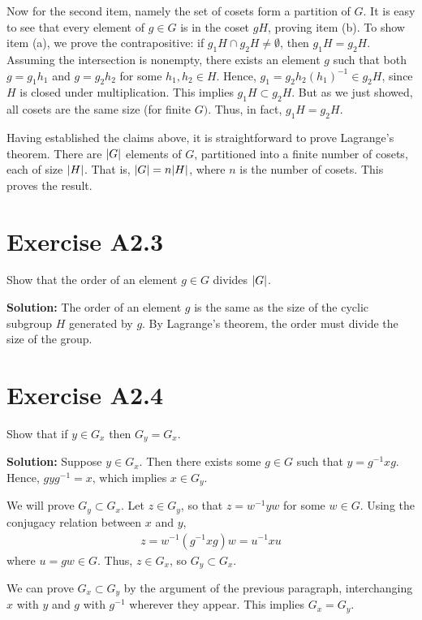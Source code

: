 \documentclass{book}
\begin{document}
    Now for the second item, namely the set of cosets form a partition of $G$. It is easy to see that every element of $g\in G$ is in the coset $gH$, proving item (b). To show item (a), we prove the contrapositive: if $g_1 H\cap g_2 H \neq \emptyset$, then $g_1 H = g_2 H$. Assuming the intersection is nonempty, there exists an element $g$ such that both $g = g_1 h_1$ and $g = g_2 h_2$ for some $h_1, h_2 \in H$. Hence, $g_1 = g_2 h_2 (h_1)^{-1} \in g_2 H$, since $H$ is closed under multiplication. This implies $g_1 H \subset g_2 H$. But as we just showed, all cosets are the same size (for finite $G)$. Thus, in fact, $g_1 H = g_2 H$.
    
    Having established the claims above, it is straightforward to prove Lagrange's theorem. There are $\abs{G}$ elements of $G$, partitioned into a finite number of cosets, each of size $\abs{H}$. That is, $\abs{G} = n\abs{H}$, where $n$ is the number of cosets. This proves the result.
    
\section*{Exercise A2.3}
    Show that the order of an element $g\in G$ divides $\abs{G}$.
    
    \textbf{Solution:} The order of an element $g$ is the same as the size of the cyclic subgroup $H$ generated by $g$. By Lagrange's theorem, the order must divide the size of the group.
    
\section*{Exercise A2.4}
    Show that if $y\in G_x$ then $G_y = G_x$.
    
    \textbf{Solution:} Suppose $y\in G_x$. Then there exists some $g\in G$ such that $y=g^{-1} x g$. Hence, $g y g^{-1} = x$, which implies $x \in G_y$. 
    
    We will prove $G_y \subset G_x$. Let $z \in G_y$, so that $z = w^{-1}y w$ for some $w\in G$. Using the conjugacy relation between $x$ and $y$,
    \begin{align}
        z = w^{-1}(g^{-1}xg)w = u^{-1}x u
    \end{align}
    where $u = gw \in G$. Thus, $z \in G_x$, so $G_y \subset G_x$.
    
    We can prove $G_x \subset G_y$ by the argument of the previous paragraph, interchanging $x$ with $y$ and $g$ with $g^{-1}$ wherever they appear. This implies $G_x = G_y$. 
\end{document}
